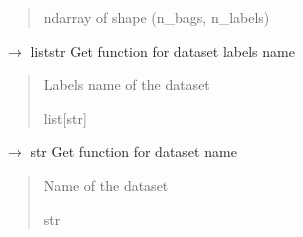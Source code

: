 \documentclass[letterpaper,10pt,english]{sphinxmanual}
\begin{document}
\begin{fulllineitems}
\begin{fulllineitems}
\begin{quote}
\begin{description}
\sphinxAtStartPar
ndarray of shape (n\_bags, n\_labels)

\end{description}\end{quote}

\end{fulllineitems}


\begin{fulllineitems}
\label{\detokenize{data/_autosummary/miml.data.miml_dataset.MIMLDataset:miml.data.miml_dataset.MIMLDataset.get_labels_name}}
\pysigstartsignatures
\pysiglinewithargsret
{}
{}
{{ $\rightarrow$ list\DUrole{p}{{[}}str\DUrole{p}{{]}}}}
\pysigstopsignatures
\sphinxAtStartPar
Get function for dataset labels name
\begin{quote}\begin{description}
\sphinxAtStartPar
{} \textendash{} Labels name of the dataset

\sphinxAtStartPar
list{[}str{]}

\end{description}\end{quote}

\end{fulllineitems}


\begin{fulllineitems}
\label{\detokenize{data/_autosummary/miml.data.miml_dataset.MIMLDataset:miml.data.miml_dataset.MIMLDataset.get_name}}
\pysigstartsignatures
\pysiglinewithargsret
{}
{}
{{ $\rightarrow$ str}}
\pysigstopsignatures
\sphinxAtStartPar
Get function for dataset name
\begin{quote}\begin{description}
\sphinxAtStartPar
{} \textendash{} Name of the dataset

\sphinxAtStartPar
str

\end{description}\end{quote}


\end{fulllineitems}
\end{fulllineitems}
\end{document}
